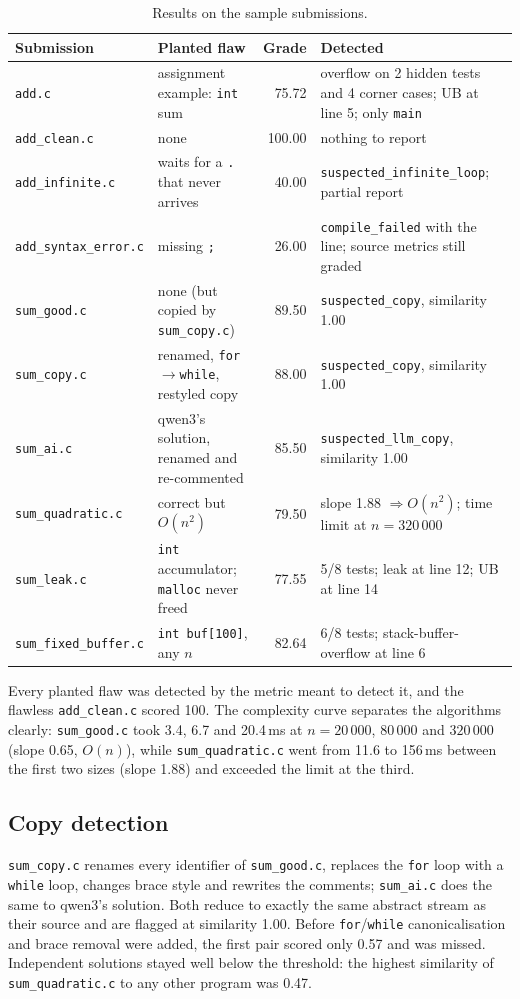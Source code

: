 \documentclass[11pt,a4paper]{article}
\newcommand{\file}[1]{\nolinkurl{#1}}
\begin{document}
\begin{longtable}{@{}P{3.7cm}P{4.0cm}rP{5.6cm}@{}}
\caption{Results on the sample submissions.}\label{tab:samples}\\
\toprule
\textbf{Submission} & \textbf{Planted flaw} & \textbf{Grade} & \textbf{Detected} \\
\midrule
\endhead
\file{add.c} & assignment example: \texttt{int} sum & 75.72 & overflow on 2 hidden tests and 4 corner cases; UB at line 5; only \texttt{main} \\
\file{add_clean.c} & none & 100.00 & nothing to report \\
\file{add_infinite.c} & waits for a \texttt{.} that never arrives & 40.00 & \texttt{suspected\_infinite\_loop}; partial report \\
\file{add_syntax_error.c} & missing \texttt{;} & 26.00 & \texttt{compile\_failed} with the line; source metrics still graded \\
\file{sum_good.c} & none (but copied by \file{sum_copy.c}) & 89.50 & \texttt{suspected\_copy}, similarity 1.00 \\
\file{sum_copy.c} & renamed, \texttt{for}$\rightarrow$\texttt{while}, restyled copy & 88.00 & \texttt{suspected\_copy}, similarity 1.00 \\
\file{sum_ai.c} & qwen3's solution, renamed and re-commented & 85.50 & \texttt{suspected\_llm\_copy}, similarity 1.00 \\
\file{sum_quadratic.c} & correct but $O(n^2)$ & 79.50 & slope 1.88 $\Rightarrow O(n^2)$; time limit at $n=320\,000$ \\
\file{sum_leak.c} & \texttt{int} accumulator; \texttt{malloc} never freed & 77.55 & 5/8 tests; leak at line 12; UB at line 14 \\
\file{sum_fixed_buffer.c} & \texttt{int buf[100]}, any $n$ & 82.64 & 6/8 tests; stack-buffer-overflow at line 6 \\
\bottomrule
\end{longtable}

Every planted flaw was detected by the metric meant to detect it, and the flawless \file{add_clean.c} scored 100.
The complexity curve separates the algorithms clearly: \file{sum_good.c} took 3.4, 6.7 and 20.4\,ms at
$n = 20\,000$, $80\,000$ and $320\,000$ (slope 0.65, $O(n)$), while \file{sum_quadratic.c} went from 11.6 to 156\,ms
between the first two sizes (slope 1.88) and exceeded the limit at the third.

\subsection{Copy detection}
\file{sum_copy.c} renames every identifier of \file{sum_good.c}, replaces the \texttt{for} loop with a \texttt{while}
loop, changes brace style and rewrites the comments; \file{sum_ai.c} does the same to qwen3's solution. Both reduce to
exactly the same abstract stream as their source and are flagged at similarity 1.00. Before \texttt{for}/\texttt{while}
canonicalisation and brace removal were added, the first pair scored only 0.57 and was missed. Independent solutions
stayed well below the threshold: the highest similarity of \file{sum_quadratic.c} to any other program was 0.47.
\end{document}
